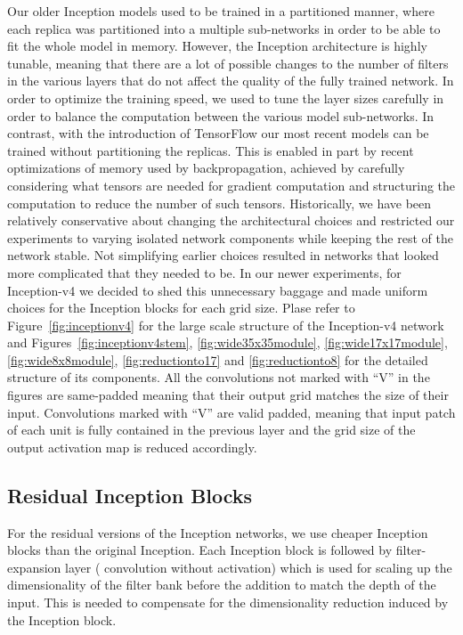 \documentclass[10pt,twocolumn,letterpaper]{article}
\begin{document}
Our older Inception models used to be trained in a partitioned manner,
where each replica was partitioned into a multiple sub-networks in order to be able to
fit the whole model in memory. However, the Inception architecture is highly
tunable, meaning that there are a lot of possible changes to the number of filters
in the various layers that do not affect the quality of the fully trained
network. In order to optimize the training speed, we used to tune the layer sizes
carefully in order to balance the computation between the various model
sub-networks.
In contrast, with the introduction of TensorFlow our most recent models
can be trained without partitioning the replicas. This is enabled in part by recent
optimizations of memory used by backpropagation, achieved by carefully considering
what tensors are needed for gradient computation and structuring the computation
to reduce the number of such tensors. Historically, we have been
relatively conservative about changing the architectural choices and restricted
our experiments to varying isolated network components while keeping the
rest of the network stable. Not simplifying earlier choices
resulted in networks that looked more complicated that they needed to be.
In our newer experiments, for Inception-v4 we decided to shed this unnecessary
baggage and made uniform choices for the Inception blocks for each grid size.
Plase refer to Figure~\ref{fig:inceptionv4} for the large scale
structure of the Inception-v4 network and Figures~\ref{fig:inceptionv4stem},
\ref{fig:wide35x35module}, \ref{fig:wide17x17module}, \ref{fig:wide8x8module},
\ref{fig:reductionto17} and \ref{fig:reductionto8} for the detailed structure
of its components. All the convolutions not marked with ``V'' in the figures
are same-padded meaning that their output grid matches the size of their input.
Convolutions marked with ``V'' are valid padded, meaning that input patch of
each unit is fully contained in the previous layer and the grid size of the
output activation map is reduced accordingly.

\subsection{Residual Inception Blocks}
For the residual versions of the Inception networks, we use cheaper Inception
blocks than the original Inception. Each Inception block is followed by
filter-expansion layer ( convolution without activation) which is
used for scaling up the dimensionality of the filter bank before the addition
to match the depth of the input. This is needed to compensate for the dimensionality
reduction induced by the Inception block.
\end{document}
